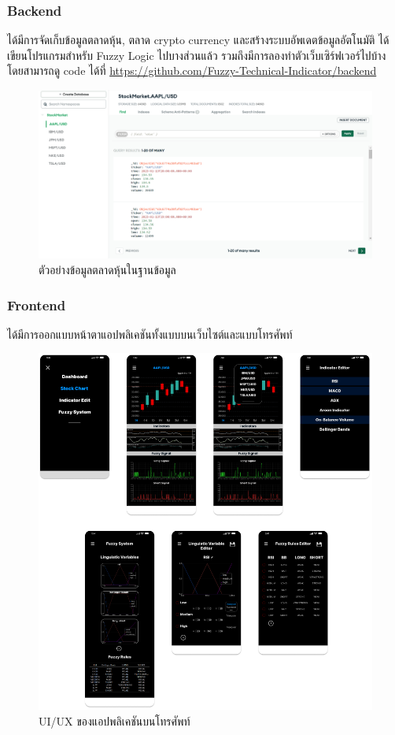 \subsubsection{Backend}
ได้มีการจัดเก็บข้อมูลตลาดหุ้น, ตลาด crypto currency และสร้างระบบอัพเดตข้อมูลอัตโนมัติ ได้เขียนโปรแกรมสำหรับ Fuzzy Logic ไปบางส่วนแล้ว
รวมถึงมีการลองทำตัวเว็บเซิร์ฟเวอร์ไปบ้าง โดยสามารถดู code ได้ที่ \url{https://github.com/Fuzzy-Technical-Indicator/backend}

\begin{figure}[ht]
    \centering
    \includegraphics[width=\textwidth]{images/db_example.png}
    \caption{ตัวอย่างข้อมูลตลาดหุ้นในฐานข้อมูล}
\end{figure}
\pagebreak

\subsubsection{Frontend}
ได้มีการออกแบบหน้าตาแอปพลิเคชันทั้งแบบบนเว็บไซต์และแบบโทรศัพท์
\begin{figure}[ht]
    \centering
    \includegraphics[width=\textwidth]{images/mobile_uiux.png}
    \caption{UI/UX ของแอปพลิเคชันบนโทรศัพท์}
\end{figure}

